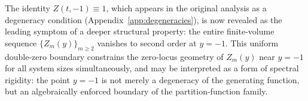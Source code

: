\begin{remark}\label{rem:boundary-rigidity}
The identity $Z(t,-1) \equiv 1$, which appears in the original analysis as a degeneracy condition (Appendix~\ref{app:degeneracies}), is now revealed as the leading symptom of a deeper structural property: the entire finite-volume sequence $\{Z_m(y)\}_{m \ge 2}$ vanishes to second order at $y = -1$.
This uniform double-zero boundary constrains the zero-locus geometry of $Z_m(y)$ near $y = -1$ for all system sizes simultaneously, and may be interpreted as a form of spectral rigidity: the point $y = -1$ is not merely a degeneracy of the generating function, but an algebraically enforced boundary of the partition-function family.
\end{remark}


